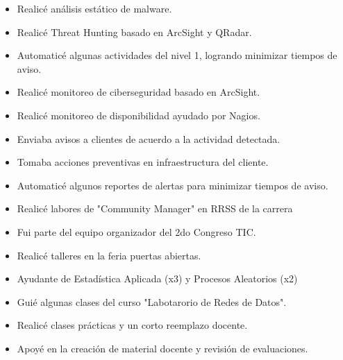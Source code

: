 \divider

\begin{itemize}
  \item Realicé análisis estático de malware.
  \item Realicé Threat Hunting basado en ArcSight y QRadar.
  \item \faStar Automaticé algunas actividades del nivel 1, logrando minimizar tiempos de aviso.
\end{itemize}

\divider

\begin{itemize}
  \item Realicé monitoreo de ciberseguridad basado en ArcSight.
  \item Realicé monitoreo de disponibilidad ayudado por Nagios.
  \item Enviaba avisos a clientes de acuerdo a la actividad detectada.
  \item Tomaba acciones preventivas en infraestructura del cliente.
  \item \faStar Automaticé algunos reportes de alertas para minimizar tiempos de aviso. 
\end{itemize}

\divider

\begin{itemize}
  \item Realicé labores de "Community Manager" en RRSS de la carrera
  \item Fui parte del equipo organizador del 2do Congreso TIC.
  \item Realicé talleres en la feria puertas abiertas.
\end{itemize}

\divider

\begin{itemize}
  \item Ayudante de Estadística Aplicada (x3) y Procesos Aleatorios (x2)
  \item Guié algunas clases del curso "Labotarorio de Redes de Datos".
  \item Realicé clases prácticas y un corto reemplazo docente.
  \item Apoyé en la creación de material docente y revisión de evaluaciones.
\end{itemize}


